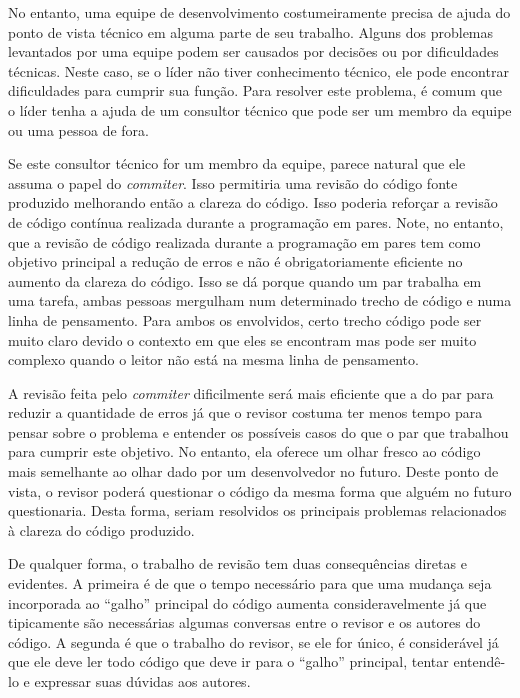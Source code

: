 No entanto, uma equipe de desenvolvimento costumeiramente precisa de
ajuda do ponto de vista técnico em alguma parte de seu
trabalho. Alguns dos problemas levantados por uma equipe podem ser
causados por decisões ou por dificuldades técnicas. Neste caso, se o
líder não tiver conhecimento técnico, ele pode encontrar dificuldades
para cumprir sua função. Para resolver este problema, é comum que o
líder tenha a ajuda de um consultor técnico que pode ser um membro da
equipe ou uma pessoa de fora.

Se este consultor técnico for um membro da equipe, parece natural que
ele assuma o papel do \emph{commiter}. Isso permitiria uma revisão do
código fonte produzido melhorando então a clareza do código.
Isso poderia reforçar a revisão de código contínua realizada durante a
programação em pares. Note, no entanto, que a revisão de código
realizada durante a programação em pares tem como objetivo principal a
redução de erros e não é obrigatoriamente eficiente no aumento da
clareza do código. Isso se dá porque quando um par trabalha em uma
tarefa, ambas pessoas mergulham num determinado trecho de código e
numa linha de pensamento. Para ambos os envolvidos, certo trecho
código pode ser muito claro devido o contexto em que eles se encontram
mas pode ser muito complexo quando o leitor não está na mesma linha de
pensamento.

A revisão feita pelo \emph{commiter} dificilmente será mais eficiente
que a do par para reduzir a quantidade de erros já que o revisor
costuma ter menos tempo para pensar sobre o problema e entender os
possíveis casos do que o par que trabalhou para cumprir este
objetivo. No entanto, ela oferece um olhar fresco ao código mais
semelhante ao olhar dado por um desenvolvedor no futuro. Deste ponto
de vista, o revisor poderá questionar o código da mesma forma que
alguém no futuro questionaria. Desta forma, seriam resolvidos os
principais problemas relacionados à clareza do código produzido.

De qualquer forma, o trabalho de revisão tem duas consequências
diretas e evidentes. A primeira é de que o tempo necessário para que
uma mudança seja incorporada ao ``galho'' principal do código aumenta
consideravelmente já que tipicamente são necessárias algumas conversas
entre o revisor e os autores do código. A segunda é que o trabalho do
revisor, se ele for único, é considerável já que ele deve ler todo
código que deve ir para o ``galho'' principal, tentar entendê-lo e
expressar suas dúvidas aos autores.

